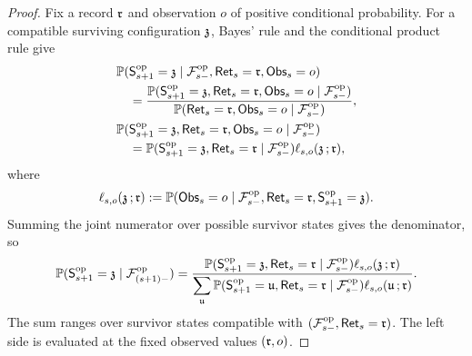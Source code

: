 \begin{proof}
Fix a record \(\mathfrak r\) and observation \(o\) of positive
conditional probability. For a compatible surviving configuration
\(\mathfrak z\), Bayes' rule and the conditional product rule give
\begin{align*}
 &\mathbb P(\mathsf S^{\mathrm{op}}_{s+1}=\mathfrak z
       \mid\mathcal F^{\mathrm{op}}_{s-},\mathsf{Ret}_{s}=\mathfrak r,
             \mathsf{Obs}_{s}=o)\\
 &\quad=
 \frac{\mathbb P(\mathsf S^{\mathrm{op}}_{s+1}=\mathfrak z,
        \mathsf{Ret}_{s}=\mathfrak r,\mathsf{Obs}_{s}=o
        \mid\mathcal F^{\mathrm{op}}_{s-})}
      {\mathbb P(\mathsf{Ret}_{s}=\mathfrak r,
         \mathsf{Obs}_{s}=o\mid\mathcal F^{\mathrm{op}}_{s-})},\\
 &\mathbb P(\mathsf S^{\mathrm{op}}_{s+1}=\mathfrak z,
       \mathsf{Ret}_{s}=\mathfrak r,\mathsf{Obs}_{s}=o
       \mid\mathcal F^{\mathrm{op}}_{s-})\\
 &\quad=
 \mathbb P(\mathsf S^{\mathrm{op}}_{s+1}=\mathfrak z,
       \mathsf{Ret}_{s}=\mathfrak r\mid\mathcal F^{\mathrm{op}}_{s-})
 \ell_{s,o}(\mathfrak z\,;\mathfrak r),
\end{align*}
where
\begin{equation}
 \ell_{s,o}(\mathfrak z\,;\mathfrak r)
 :=\mathbb P(\mathsf{Obs}_{s}=o
       \mid\mathcal F^{\mathrm{op}}_{s-},\mathsf{Ret}_{s}=\mathfrak r,
                    \mathsf S^{\mathrm{op}}_{s+1}=\mathfrak z).
 \label{app:eq:survivor-likelihood}
\end{equation}
Summing the joint numerator over possible survivor states gives the
denominator, so
\begin{equation}
 \mathbb P(\mathsf S^{\mathrm{op}}_{s+1}=\mathfrak z
       \mid\mathcal F^{\mathrm{op}}_{(s+1)-})
 =
 \frac{\mathbb P(\mathsf S^{\mathrm{op}}_{s+1}=\mathfrak z,
       \mathsf{Ret}_{s}=\mathfrak r\mid\mathcal F^{\mathrm{op}}_{s-})
       \ell_{s,o}(\mathfrak z\,;\mathfrak r)}
      {\displaystyle\sum_{\mathfrak u}
       \mathbb P(\mathsf S^{\mathrm{op}}_{s+1}=\mathfrak u,
       \mathsf{Ret}_{s}=\mathfrak r\mid\mathcal F^{\mathrm{op}}_{s-})
       \ell_{s,o}(\mathfrak u\,;\mathfrak r)}.
 \label{app:eq:survivor-bayes-odds}
\end{equation}
The sum ranges over survivor states compatible with
\((\mathcal F^{\mathrm{op}}_{s-},\mathsf{Ret}_{s}=\mathfrak r)\).
The left side is evaluated at the fixed observed values
\((\mathfrak r,o)\).


\end{proof}
